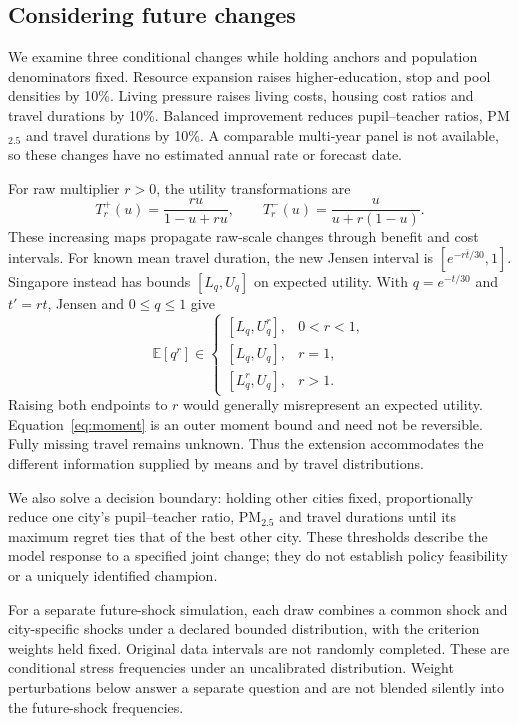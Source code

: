 \subsection{Considering future changes}
We examine three conditional changes while holding anchors and population
denominators fixed. Resource expansion raises higher-education, stop and pool
densities by 10\%. Living pressure raises living costs, housing cost ratios and
travel durations by 10\%. Balanced improvement reduces pupil--teacher ratios,
PM$_{2.5}$ and travel durations by 10\%. A comparable multi-year panel is not
available, so these changes have no estimated annual rate or forecast date.

For raw multiplier $r>0$, the utility transformations are
\begin{equation}
 T_r^{+}(u)=\frac{ru}{1-u+ru},\qquad
 T_r^{-}(u)=\frac{u}{u+r(1-u)}.
\end{equation}
These increasing maps propagate raw-scale changes through benefit and cost
intervals. For known mean travel duration, the new Jensen interval is
$[e^{-r\bar t/30},1]$. Singapore instead has bounds $[L_q,U_q]$ on expected
utility. With $q=e^{-t/30}$ and $t'=rt$, Jensen and $0\leq q\leq1$ give
\begin{equation}
 \mathbb E[q^r]\in
 \begin{cases}
 [L_q,U_q^r],&0<r<1,\\
 [L_q,U_q],&r=1,\\
 [L_q^r,U_q],&r>1.
 \end{cases}
 \label{eq:moment}
\end{equation}
Raising both endpoints to $r$ would generally misrepresent an expected utility.
Equation~\ref{eq:moment} is an outer moment bound and need not be reversible.
Fully missing travel remains unknown. Thus the extension accommodates the
different information supplied by means and by travel distributions.

\FutureDeterministic
We also solve a decision boundary: holding other cities fixed, proportionally
reduce one city's pupil--teacher ratio, PM$_{2.5}$ and travel durations until
its maximum regret ties that of the best other city. \FutureThresholds
These thresholds describe the model response to a specified joint change;
they do not establish policy feasibility or a uniquely identified champion.
\BerlinThresholdChange

For a separate future-shock simulation, each draw combines a common shock and
city-specific shocks under a declared bounded distribution, with the criterion
weights held fixed. Original data intervals are not randomly completed.
\FutureMonteCarlo
\ProxyWithdrawalMC
These are conditional stress frequencies under an uncalibrated distribution.
Weight perturbations below answer a separate question and are not blended
silently into the future-shock frequencies.

